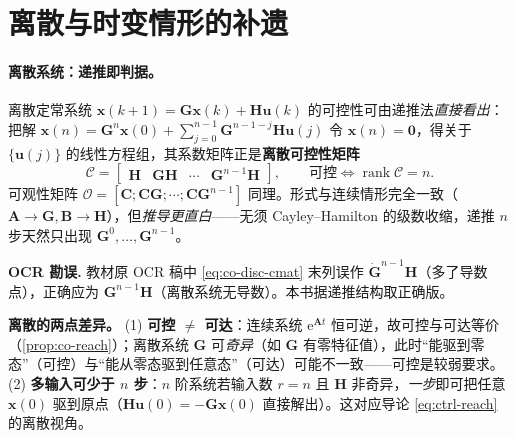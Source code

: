 \section{离散与时变情形的补遗}
\label{sec:co-discrete}

\paragraph{离散系统：递推即判据。}
离散定常系统 $\mathbf{x}(k+1)=\mathbf{G}\mathbf{x}(k)+\mathbf{H}\mathbf{u}(k)$ 的可控性可由递推法\emph{直接看出}\cite{liubao2006modern}：把解 $\mathbf{x}(n)=\mathbf{G}^n\mathbf{x}(0)+\sum_{j=0}^{n-1}\mathbf{G}^{n-1-j}\mathbf{H}\mathbf{u}(j)$ 令 $\mathbf{x}(n)=\mathbf{0}$，得关于 $\{\mathbf{u}(j)\}$ 的线性方程组，其系数矩阵正是\textbf{离散可控性矩阵}
\begin{equation}
  \mathcal{C}=\begin{bmatrix}\mathbf{H}&\mathbf{G}\mathbf{H}&\cdots&\mathbf{G}^{n-1}\mathbf{H}\end{bmatrix},\qquad \text{可控}\iff\operatorname{rank}\mathcal{C}=n.
  \label{eq:co-disc-cmat}
\end{equation}
可观性矩阵 $\mathcal{O}=[\mathbf{C};\mathbf{C}\mathbf{G};\cdots;\mathbf{C}\mathbf{G}^{n-1}]$ 同理。形式与连续情形完全一致（$\mathbf{A}\to\mathbf{G},\mathbf{B}\to\mathbf{H}$），但\emph{推导更直白}——无须 Cayley--Hamilton 的级数收缩，递推 $n$ 步天然只出现 $\mathbf{G}^0,\dots,\mathbf{G}^{n-1}$。

\begin{note}
\textbf{OCR 勘误.}\;
教材原 OCR 稿中 \cref{eq:co-disc-cmat} 末列误作 $\dot{\mathbf{G}}^{n-1}\mathbf{H}$（多了导数点），正确应为 $\mathbf{G}^{n-1}\mathbf{H}$（离散系统无导数）。本书据递推结构取正确版。
\end{note}

\begin{insight}
\textbf{离散的两点差异。}\;
(1) \textbf{可控 $\neq$ 可达}：连续系统 $\mathrm{e}^{\mathbf{A}t}$ 恒可逆，故可控与可达等价（\cref{prop:co-reach}）；离散系统 $\mathbf{G}$ 可\emph{奇异}（如 $\mathbf{G}$ 有零特征值），此时“能驱到零态”（可控）与“能从零态驱到任意态”（可达）可能不一致——可控是较弱要求。(2) \textbf{多输入可少于 $n$ 步}：$n$ 阶系统若输入数 $r=n$ 且 $\mathbf{H}$ 非奇异，\emph{一步}即可把任意 $\mathbf{x}(0)$ 驱到原点（$\mathbf{H}\mathbf{u}(0)=-\mathbf{G}\mathbf{x}(0)$ 直接解出）\cite{liubao2006modern}。这对应导论 \cref{eq:ctrl-reach} 的离散视角。
\end{insight}

